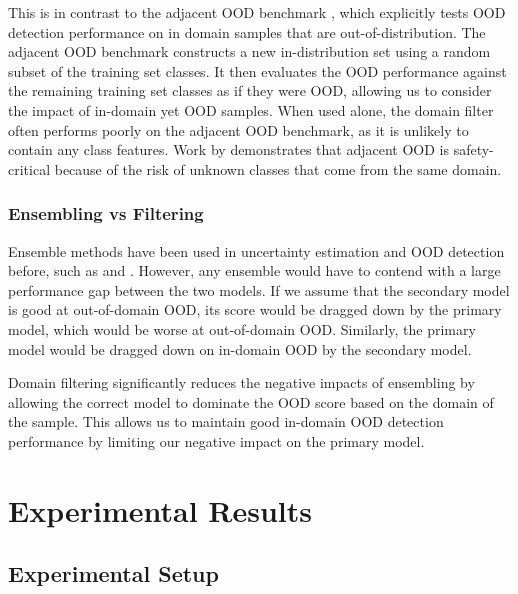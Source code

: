 \documentclass[letterpaper]{article} %
\theoremstyle{plain}
\theoremstyle{definition}
\theoremstyle{remark}
\begin{document}
This is in contrast to the adjacent OOD benchmark \cite{yangcan}, which explicitly tests OOD detection performance on in domain samples that are out-of-distribution. The adjacent OOD benchmark constructs a new in-distribution set using a random subset of the training set classes. It then evaluates the OOD performance against the remaining training set classes as if they were OOD, allowing us to consider the impact of in-domain yet OOD samples. When used alone, the domain filter often performs poorly on the adjacent OOD benchmark, as it is unlikely to contain any class features. Work by \cite{yangcan} demonstrates that adjacent OOD is safety-critical because of the risk of unknown classes that come from the same domain. 

\subsubsection{Ensembling vs Filtering}

Ensemble methods have been used in uncertainty estimation and OOD detection before, such as \citep{lakshminarayanan2017simple} and \citep{pmlr-v235-xu24ae}. However, any ensemble would have to contend with a large performance gap between the two models. If we assume that the secondary model is good at out-of-domain OOD, its score would be dragged down by the primary model, which would be worse at out-of-domain OOD. Similarly, the primary model would be dragged down on in-domain OOD by the secondary model. 

Domain filtering significantly reduces the negative impacts of ensembling by allowing the correct model to dominate the OOD score based on the domain of the sample. This allows us to maintain good in-domain OOD detection performance by limiting our negative impact on the primary model. 

\section{Experimental Results}
\label{sec:experiments}

\subsection{Experimental Setup}
\end{document}
